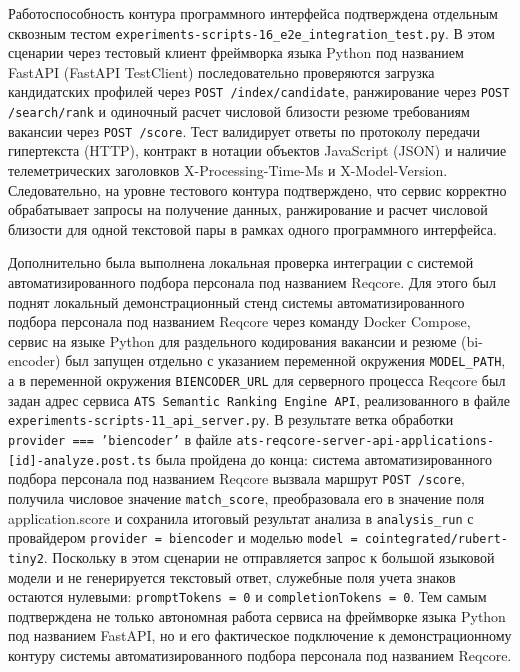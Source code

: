 Работоспособность контура программного интерфейса подтверждена отдельным сквозным тестом \texttt{experiments-scripts-16\_e2e\_integration\_test.py}. В этом сценарии через тестовый клиент фреймворка языка Python под названием FastAPI (FastAPI TestClient) последовательно проверяются загрузка кандидатских профилей через \texttt{POST {\slash}index{\slash}candidate}, ранжирование через \texttt{POST {\slash}search{\slash}rank} и одиночный расчет числовой близости резюме требованиям вакансии через \texttt{POST {\slash}score}. Тест валидирует ответы по протоколу передачи гипертекста (HTTP), контракт в нотации объектов JavaScript (JSON) и наличие телеметрических заголовков X-Processing-Time-Ms и X-Model-Version. Следовательно, на уровне тестового контура подтверждено, что сервис корректно обрабатывает запросы на получение данных, ранжирование и расчет числовой близости для одной текстовой пары в рамках одного программного интерфейса.

Дополнительно была выполнена локальная проверка интеграции с системой автоматизированного подбора персонала под названием Reqcore. Для этого был поднят локальный демонстрационный стенд системы автоматизированного подбора персонала под названием Reqcore через команду Docker Compose, сервис на языке Python для раздельного кодирования вакансии и резюме (bi-encoder) был запущен отдельно с указанием переменной окружения \texttt{MODEL\_PATH}, а в переменной окружения \texttt{BIENCODER\_URL} для серверного процесса Reqcore был задан адрес сервиса \texttt{ATS Semantic Ranking Engine API}, реализованного в файле \texttt{experiments-scripts-11\_api\_server.py}. В результате ветка обработки \texttt{provider === 'biencoder'} в файле \texttt{ats-reqcore-server-api-applications-{[}id{]}-analyze.post.ts} была пройдена до конца: система автоматизированного подбора персонала под названием Reqcore вызвала маршрут \texttt{POST {\slash}score}, получила числовое значение \texttt{match\_score}, преобразовала его в значение поля application.score и сохранила итоговый результат анализа в \texttt{analysis\_run} с провайдером \texttt{provider = biencoder} и моделью \texttt{model = cointegrated/rubert-tiny2}. Поскольку в этом сценарии не отправляется запрос к большой языковой модели и не генерируется текстовый ответ, служебные поля учета знаков остаются нулевыми: \texttt{promptTokens = 0} и \texttt{completionTokens = 0}. Тем самым подтверждена не только автономная работа сервиса на фреймворке языка Python под названием FastAPI, но и его фактическое подключение к демонстрационному контуру системы автоматизированного подбора персонала под названием Reqcore.

